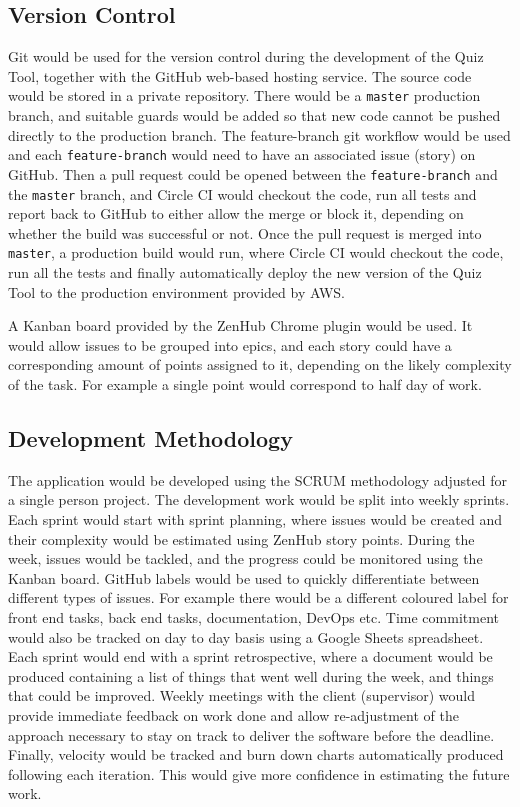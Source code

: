 \subsection{Version Control}
\label{subsection:versioncontrol}
Git\cite{29} would be used for the version control during the development of the Quiz Tool, together with
the GitHub\cite{30} web-based hosting service. The source code would be stored in a private
repository. There would be a \texttt{master} production branch, and suitable guards would be added
so that new code cannot be pushed directly to the production branch. The feature-branch git
workflow\cite{31} would be used and each \texttt{feature-branch} would need to have an associated issue
(story) on GitHub. Then a pull request could be opened between the \texttt{feature-branch} and the \texttt{master}
branch, and Circle CI would checkout the code, run all tests and report back to GitHub to either
allow the merge or block it, depending on whether the build was successful or not. Once the pull request
is merged into \texttt{master}, a production build would run, where Circle CI would checkout the code, run
all the tests and finally automatically deploy the new version of the Quiz Tool to the production
environment provided by AWS.

A Kanban board provided by the ZenHub Chrome plugin\cite{32} would be used. It would allow issues to be grouped
into epics, and each story could have a corresponding amount of points assigned to it, depending
on the likely complexity of the task. For example a single point would correspond to half day of work.

\subsection{Development Methodology}
\label{subsection:scrum}
The application would be developed using the SCRUM methodology adjusted for a single person project.
The development work would be split into weekly sprints. Each sprint would start with sprint
planning, where issues would be created and their complexity would be estimated using ZenHub
story points. During the week, issues would be tackled, and the progress could be monitored using
the Kanban board. GitHub labels would be used to quickly differentiate between different types
of issues. For example there would be a different coloured label for front end tasks, back end
tasks, documentation, DevOps etc. Time commitment would also be tracked on day to day basis
using a Google Sheets spreadsheet\cite{33}. Each sprint would end with a sprint retrospective, where
a document would be produced containing a list of things that went well during the week, and things
that could be improved. Weekly meetings with the client (supervisor) would provide immediate feedback
on work done and allow re-adjustment of the approach necessary to stay on track to deliver the
software before the deadline. Finally, velocity would be tracked and burn down charts automatically
produced following each iteration. This would give more confidence in estimating the future work.


